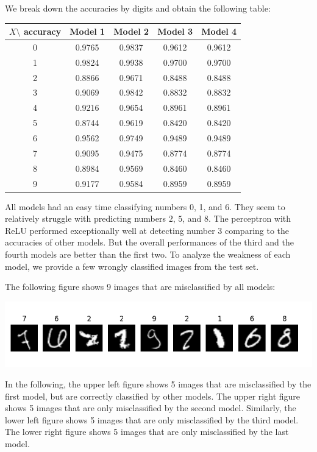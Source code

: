 \documentclass{article}
\begin{document}
We break down the accuracies by digits and obtain the following table:
\begin{center}
\bgroup
\def\arraystretch{1.2}
\begin{tabular}{c|c|c|c|c}
\hline
$X\setminus$ accuracy & Model 1 & Model 2 & Model 3 & Model 4 \\
\hline
0 & 0.9765 & 0.9837 & 0.9612 & 0.9612 \\
\hline
1 & 0.9824 & 0.9938 & 0.9700 & 0.9700 \\
\hline
2 & 0.8866 & 0.9671 & 0.8488 & 0.8488 \\
\hline
3 & 0.9069 & 0.9842 & 0.8832 & 0.8832 \\
\hline
4 & 0.9216 & 0.9654 & 0.8961 & 0.8961 \\
\hline
5 & 0.8744 & 0.9619 & 0.8420 & 0.8420 \\
\hline
6 & 0.9562 & 0.9749 & 0.9489 & 0.9489 \\
\hline
7 & 0.9095 & 0.9475 & 0.8774 & 0.8774 \\
\hline
8 & 0.8984 & 0.9569 & 0.8460 & 0.8460 \\
\hline
9 & 0.9177 & 0.9584 & 0.8959 & 0.8959 \\
\hline
\end{tabular}
\egroup
\end{center}
\medskip

All models had an easy time classifying numbers 0, 1, and 6. They seem to relatively struggle with predicting numbers $2$, $5$, and $8$. The perceptron with ReLU performed exceptionally well at detecting number 3 comparing to the accuracies of other models. But the overall performances of the third and the fourth models are better than the first two.
To analyze the weakness of each model, we provide a few wrongly classified images from the test set.

The following figure shows 9 images that are misclassified by all models:

\begin{minipage}{0.8\linewidth}
\includegraphics[width = \linewidth]{W.png}
\end{minipage}

In the following, the upper left figure shows 5 images that are misclassified by the first model, but are correctly classified by other models. The upper right figure shows 5 images that are only misclassified by the second model. Similarly, the lower left figure shows 5 images that are only misclassified by the third model. The lower right figure shows 5 images that are only misclassified by the last model.
\end{document}
